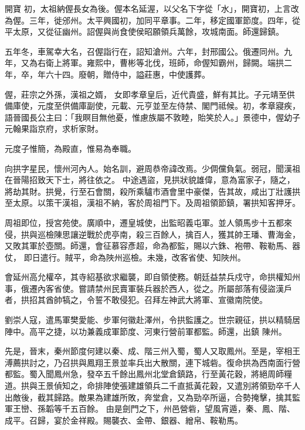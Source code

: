 \begin{pinyinscope}
 開寶
 初，太祖納偓長女為後。偓本名延渥，以父名下字從「水」，開寶初，上言改為偓。三年，徙邠州。太平興國初，加同平章事。二年，移定國軍節度。四年，從平太原，又從征幽州。詔偓與尚食使侯昭願領兵萬餘，攻城南面。師還歸鎮。



 五年冬，車駕幸大名，召偓詣行在，詔知滄州。六年，封邢國公。俄遷同州。九年，又為右衛上將軍。雍熙中，曹彬等北伐，班師，命偓知霸州，歸闕。端拱二年，卒，年六十四。廢朝，贈侍中，謚莊惠，中使護葬。



 偓，莊宗之外孫，漢祖之婿，
 女即孝章皇后，近代貴盛，鮮有其比。子元靖至供備庫使，元度至供備庫副使，元載、元亨並至左侍禁、閣門祗候。初，孝章寢疾，語晉國長公主曰：「我瞑目無他憂，惟慮族屬不敦睦，貽笑於人。」景德中，偓幼子元翰果詣京府，求析家財。



 元度子惟簡，為殿直，惟易為奉職。



 向拱字星民，懷州河內人。始名訓，避周恭帝諱改焉。少倜儻負氣。弱冠，聞漢祖在晉陽招致天下士，將往依之。
 中途遇盜，見拱狀貌雄偉，意為富家子，隨之，將劫其財。拱覺，行至石會關，殺所乘驢市酒會里中豪傑，告其故，咸出丁壯護拱至太原。以策干漢祖，漢祖不納，客於周祖門下。及周祖領節鎮，署拱知客押牙。



 周祖即位，授宮苑使。廣順中，遷皇城使，出監昭義屯軍。並人領馬步十五都來侵，拱與巡檢陳思讓逆戰於虎亭南，殺三百餘人，擒百人，獲其帥王璠、曹海金，又敗其軍於壺關。師還，會征慕容彥超，命為都監，賜以六銖、袍帶、鞍勒馬、器仗，
 即日遣行。賊平，命為陜州巡檢。未幾，改客省使、知陜州。



 會延州高允權卒，其寺紹基欲求繼襲，即自領使務。朝廷益禁兵戍守，命拱權知州事，俄遷內客省使。嘗請禁州民賣軍裝兵器於西人，從之。所屬部落有侵盜漢戶者，拱招其酋帥犒之，令誓不敢侵犯。召拜左神武大將軍、宣徽南院使。



 劉崇人寇，遣馬軍樊愛能、步軍何徽赴澤州，令拱監護之。世宗親征，拱以精騎居陣中。高平之捷，以功兼義成軍節度、河東行營前軍都監。師還，出鎮
 陳州。



 先是，晉末，秦州節度何建以秦、成、階三州入蜀，蜀人又取鳳州。至是，宰相王溥薦拱討之，乃召拱與鳳翔王景並率兵出大散關，連下城砦。復命拱為西南面行營都監。蜀入聞鳳州急，發卒五千餘出鳳州北堂倉鎮路，行至黃花穀，將絕周師糧道。拱與王景偵知之，命排陣使張建雄領兵二千直抵黃花穀，又遣別將領勁卒千人出敵後，截其歸路。敵果為建雄所敗，奔堂倉，又為勁卒所逼，合勢掩擊，擒其監軍王巒、孫韜等千五百餘。
 由是劍門之下，州邑營砦，望風宵遁，秦、鳳、階、成平。召歸，宴於金祥殿。賜襲衣、金帶、銀器、繒帛、鞍勒馬。




\end{pinyinscope}

